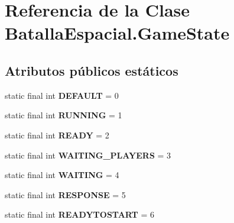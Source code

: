\hypertarget{classBatallaEspacial_1_1GameState}{
\section{Referencia de la Clase BatallaEspacial.GameState}
\label{classBatallaEspacial_1_1GameState}
}
\subsection*{Atributos públicos estáticos}
\begin{DoxyCompactItemize}
\item 
\hypertarget{classBatallaEspacial_1_1GameState_acedddb7fa63ab67d9223109fff34d4d4}{
static final int {\bfseries DEFAULT} = 0}
\label{classBatallaEspacial_1_1GameState_acedddb7fa63ab67d9223109fff34d4d4}

\item 
\hypertarget{classBatallaEspacial_1_1GameState_a15dea48cde3eb19293b86c18273c88b9}{
static final int {\bfseries RUNNING} = 1}
\label{classBatallaEspacial_1_1GameState_a15dea48cde3eb19293b86c18273c88b9}

\item 
\hypertarget{classBatallaEspacial_1_1GameState_a7ce1640efb38d72abdc750630f25b79f}{
static final int {\bfseries READY} = 2}
\label{classBatallaEspacial_1_1GameState_a7ce1640efb38d72abdc750630f25b79f}

\item 
\hypertarget{classBatallaEspacial_1_1GameState_a1334bf51ceec78da3c33cb1fc0fd7879}{
static final int {\bfseries WAITING\_\-PLAYERS} = 3}
\label{classBatallaEspacial_1_1GameState_a1334bf51ceec78da3c33cb1fc0fd7879}

\item 
\hypertarget{classBatallaEspacial_1_1GameState_a7c608dec8d5074fdb45a8b0046184170}{
static final int {\bfseries WAITING} = 4}
\label{classBatallaEspacial_1_1GameState_a7c608dec8d5074fdb45a8b0046184170}

\item 
\hypertarget{classBatallaEspacial_1_1GameState_a4794e0e1caca125321a06c021a5a1141}{
static final int {\bfseries RESPONSE} = 5}
\label{classBatallaEspacial_1_1GameState_a4794e0e1caca125321a06c021a5a1141}

\item 
\hypertarget{classBatallaEspacial_1_1GameState_a452d83e990f288cab0acb3a357621223}{
static final int {\bfseries READYTOSTART} = 6}
\label{classBatallaEspacial_1_1GameState_a452d83e990f288cab0acb3a357621223}

\end{DoxyCompactItemize}


